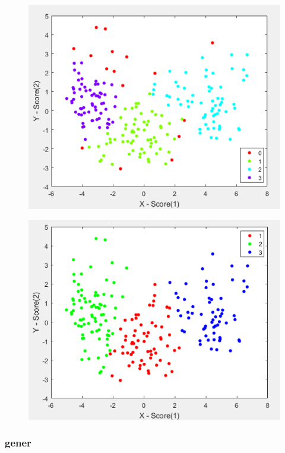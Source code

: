 \documentclass[a4paper,10pt,table]{article}
\begin{document}
\begin{figure}[h]
\centering
\begin{minipage}{.5\textwidth}
  \centering
  \includegraphics[width=.9\linewidth]{seedsex.png}
  \label{fig:test1}
\end{minipage}%
\begin{minipage}{.5\textwidth}
  \centering
  \includegraphics[width=.9\linewidth]{seedskm.png}
  \label{fig:test2}
\end{minipage}
\end{figure}
\newpage
\subsubsection{gener}
\end{document}
